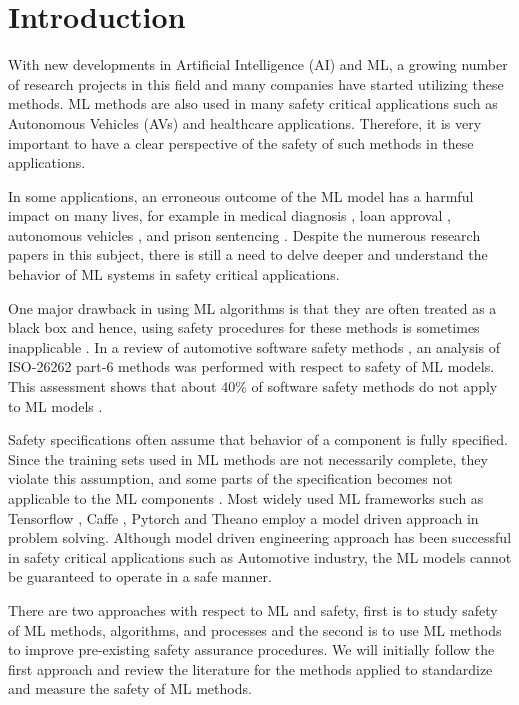 \chapter{Introduction}

With new developments in Artificial Intelligence (AI) and ML, a growing number of research projects in this field and many companies have started utilizing these methods.
ML methods are also used in many safety critical applications such as Autonomous Vehicles (AVs) and healthcare applications. Therefore, it is very important to have a clear perspective of the safety of such methods in these applications.

In some applications, an erroneous outcome of the ML model has a harmful impact on many lives, for example in medical diagnosis \cite{Foster2014}, loan approval \cite{Lessmann2015}, autonomous vehicles \cite{koopman2016challenges}, and prison sentencing \cite{Berk2015}.
Despite the numerous research papers in this subject, there is still a need to delve deeper and understand the behavior of ML systems in safety critical applications.

One major drawback in using ML algorithms is that they are often treated as a black box and hence, using safety procedures for these methods is sometimes inapplicable \cite{Schwalbe2020}. In a review of automotive software safety methods \cite{Salay2017}, an analysis of ISO-26262 part-6 methods was performed with respect to safety of ML models. This assessment shows that about 40\% of software safety methods do not apply to ML models \cite{Salay2017}.


Safety specifications often assume that behavior of a component is fully specified. Since the training sets used in ML methods are not necessarily complete, they violate this assumption, and some parts of the specification becomes not applicable to the ML components \cite{Salay2017}. 
Most widely used ML frameworks such as Tensorflow \cite{Abadi2016Tensor}, Caffe \cite{Caffe2014}, Pytorch \cite{pytorch2019} and Theano \cite{Al-Rfou} employ a model driven approach in problem solving. Although model driven engineering approach has been successful in safety critical applications such as Automotive industry, the ML models cannot be guaranteed to operate in a safe manner. 

There are two approaches with respect to ML and safety, first is to study safety of ML methods, algorithms, and processes and the second is to use ML methods to improve pre-existing safety assurance procedures.
We will initially follow the first approach and review the literature for the methods applied to standardize and measure the safety of ML methods.

